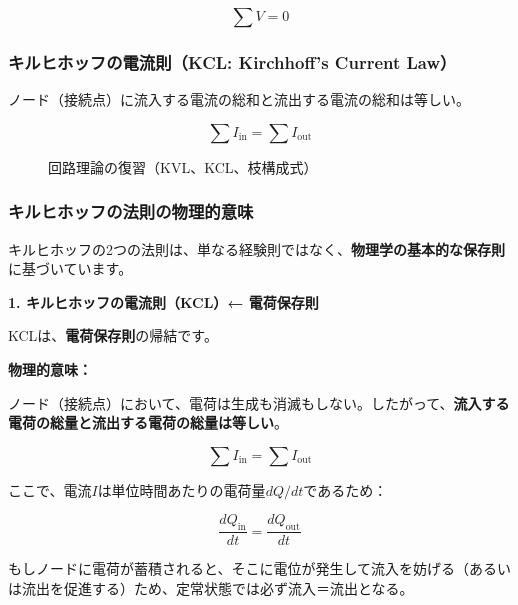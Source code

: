 \begin{equation}
\sum V = 0
\end{equation}

\subsubsection{キルヒホッフの電流則（KCL: Kirchhoff's Current Law）}

ノード（接続点）に流入する電流の総和と流出する電流の総和は等しい。

\begin{equation}
\sum I_{\text{in}} = \sum I_{\text{out}}
\end{equation}

\begin{figure}[H]
\centering
{}
\caption{回路理論の復習（KVL、KCL、枝構成式）}
\label{fig:circuit_basics}
\end{figure}

\subsubsection{キルヒホッフの法則の物理的意味}

キルヒホッフの2つの法則は、単なる経験則ではなく、\textbf{物理学の基本的な保存則}に基づいています。

\textbf{1. キルヒホッフの電流則（KCL）← 電荷保存則}

KCLは、\textbf{電荷保存則}の帰結です。

\begin{screen}
\textbf{物理的意味：}

ノード（接続点）において、電荷は生成も消滅もしない。したがって、\textbf{流入する電荷の総量と流出する電荷の総量は等しい}。

\begin{equation}
\sum I_{\text{in}} = \sum I_{\text{out}}
\end{equation}

ここで、電流$I$は単位時間あたりの電荷量$dQ/dt$であるため：

\begin{equation}
\frac{dQ_{\text{in}}}{dt} = \frac{dQ_{\text{out}}}{dt}
\end{equation}

もしノードに電荷が蓄積されると、そこに電位が発生して流入を妨げる（あるいは流出を促進する）ため、定常状態では必ず流入＝流出となる。
\end{screen}

